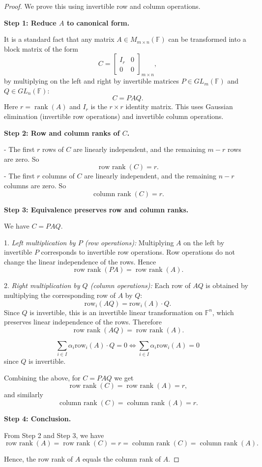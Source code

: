 \begin{proof}
We prove this using invertible row and column operations.

\textbf{Step 1: Reduce $A$ to canonical form.} 

It is a standard fact that any matrix $A \in M_{m \times n}(\mathbb{F})$ can be transformed into a block matrix of the form
\[
C = 
\begin{bmatrix}
I_r & 0 \\
0 & 0
\end{bmatrix}_{m \times n},
\]
by multiplying on the left and right by invertible matrices $P \in GL_m(\mathbb{F})$ and $Q \in GL_n(\mathbb{F})$:
\[
C = P A Q.
\]
Here $r = \operatorname{rank}(A)$ and $I_r$ is the $r \times r$ identity matrix. This uses Gaussian elimination (invertible row operations) and invertible column operations.

\textbf{Step 2: Row and column ranks of $C$.}

- The first $r$ rows of $C$ are linearly independent, and the remaining $m-r$ rows are zero. So
\[
\operatorname{row\ rank}(C) = r.
\]
- The first $r$ columns of $C$ are linearly independent, and the remaining $n-r$ columns are zero. So
\[
\operatorname{column\ rank}(C) = r.
\]

\textbf{Step 3: Equivalence preserves row and column ranks.}

We have $C = P A Q$.  

1. \emph{Left multiplication by $P$ (row operations):}  
   Multiplying $A$ on the left by invertible $P$ corresponds to invertible row operations. Row operations do not change the linear independence of the rows. Hence
   \[
   \operatorname{row\ rank}(PA) = \operatorname{row\ rank}(A).
   \]

2. \emph{Right multiplication by $Q$ (column operations):}  
   Each row of $A Q$ is obtained by multiplying the corresponding row of $A$ by $Q$:
   \[
   \text{row}_i(AQ) = \text{row}_i(A) \cdot Q.
   \]
   Since $Q$ is invertible, this is an invertible linear transformation on $\mathbb{F}^n$, which preserves linear independence of the rows. Therefore
   \[
   \operatorname{row\ rank}(AQ) = \operatorname{row\ rank}(A).
   \]
\begin{note}
    \[
        \sum_{i \in I} \alpha _i \mathrm{row}_i (A) \cdot Q = 0 \iff  \sum_{i \in I} \alpha _i \mathrm{row}_i (A) = 0 
    \] since \(Q\) is invertible. 
\end{note}

Combining the above, for $C = P A Q$ we get
\[
\operatorname{row\ rank}(C) = \operatorname{row\ rank}(A) = r,
\]
and similarly
\[
\operatorname{column\ rank}(C) = \operatorname{column\ rank}(A) = r.
\]

\textbf{Step 4: Conclusion.}

From Step 2 and Step 3, we have
\[
\operatorname{row\ rank}(A) = \operatorname{row\ rank}(C) = r = \operatorname{column\ rank}(C) = \operatorname{column\ rank}(A).
\]

Hence, the row rank of $A$ equals the column rank of $A$.
\end{proof}



